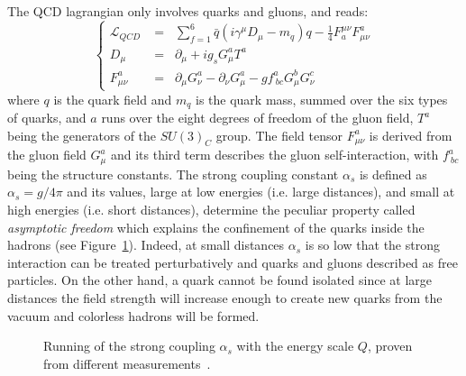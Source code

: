 The QCD lagrangian only involves quarks and gluons, and reads:
\begin{equation}
\left \{ \begin{array}{cl}
\mathcal{L}_{QCD} &=\;\; \sum\limits_{f=1}^{6}\bar{q}(i\gamma^\mu D_\mu - m_q)q 
                    -\frac{1}{4}F^{\mu\nu}_{a}F^{a}_{\mu\nu}\\
 D_\mu &=\;\; \partial_\mu + ig_sG_\mu^a T^a\\
  F^{a}_{\mu\nu} &=\;\;  \partial_\mu G_\nu^a - \partial_\nu G_\mu^a - 
                    gf^{a}_{\ bc}G^b_\mu G^c_\nu
\end{array} \right.
\end{equation}
where $q$ is the quark field and $m_q$ is the quark mass, summed over 
the six types of quarks, and $a$ runs over the eight degrees of 
freedom of the gluon field, $T^a$ being the generators
of the $SU(3)_C$ group. The field tensor $F^{a}_{\mu\nu}$ 
is derived from the gluon field $G_\mu^a$ and 
its third term describes the gluon self-interaction, with
$f^a_{\ bc}$ being the structure constants. 
The strong coupling constant $\alpha_s$ is defined
as  $\alpha_s=g/4\pi$ and its values, large at
low energies (i.e. large distances), and small at high 
energies (i.e. short distances), determine the 
peculiar property called {\it asymptotic freedom} which
explains the confinement of the quarks inside the hadrons
(see Figure~\ref{fig:alpha_s}). Indeed, at
small distances $\alpha_s$ is so low that
the strong interaction can be treated perturbatively
and quarks and gluons described as free particles.
On the other hand, a quark cannot be found
isolated since at large distances the field strength
will increase enough to create new quarks 
from the vacuum and colorless hadrons will be formed.

\begin{figure}[tbph]
\begin{center}
\caption{Running of the strong coupling $\alpha_s$ with the energy scale $Q$,
proven from different measurements~\cite{alpha_s}.}
\label{fig:alpha_s}
\end{center}
\end{figure}

